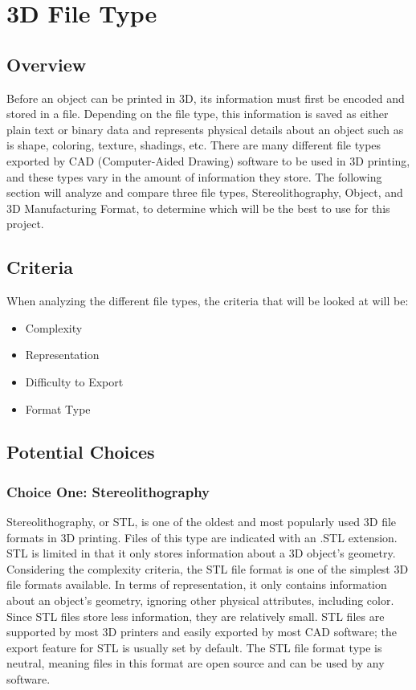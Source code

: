 \documentclass[letterpaper, onecolumn, draftclsnofoot,10pt, compsoc]{IEEEtran}
\begin{document}
\section{3D File Type}
\subsection{Overview}
Before an object can be printed in 3D, its information must first be encoded and stored in a file. 
Depending on the file type, this information is saved as either plain text or binary data and represents physical details about an object such as is shape, coloring, texture, shadings, etc. \cite{all3dpweb}
There are many different file types exported by CAD (Computer-Aided Drawing) software to be used in 3D printing, and these types vary in the amount of information they store.
The following section will analyze and compare three file types, Stereolithography, Object, and 3D Manufacturing Format, to determine which will be the best to use for this project.
 
\subsection{Criteria}
When analyzing the different file types, the criteria that will be looked at will be: 
\begin{itemize}
\item Complexity
\item Representation
\item Difficulty to Export
\item Format Type
\end{itemize}
\subsection{Potential Choices}
\subsubsection{Choice One: Stereolithography}
Stereolithography, or STL, is one of the oldest and most popularly used 3D file formats in 3D printing. 
Files of this type are indicated with an .STL extension.
STL is limited in that it only stores information about a 3D object's geometry.
Considering the complexity criteria, the STL file format is one of the simplest 3D file formats available.
In terms of representation, it only contains information about an object's geometry, ignoring other physical attributes, including color.
Since STL files store less information, they are relatively small.
STL files are supported by most 3D printers and easily exported by most CAD software; the export feature for STL is usually set by default. \cite{3dbeginweb}
The STL file format type is neutral, meaning files in this format are open source and can be used by any software.
\cite{all3dpweb}
\end{document}
